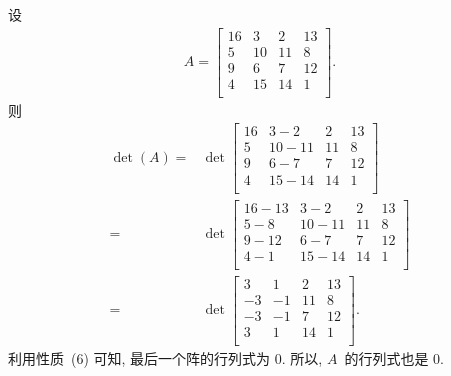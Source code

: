 \begin{example}
    设
    \begin{align*}
        A = \begin{bmatrix}
                16 & 3  & 2  & 13 \\
                5  & 10 & 11 & 8  \\
                9  & 6  & 7  & 12 \\
                4  & 15 & 14 & 1  \\
            \end{bmatrix}.
    \end{align*}
    则
    \begin{align*}
        \det {(A)}
        = {} &
        \det {
            \begin{bmatrix}
                16 & 3 - 2   & 2  & 13 \\
                5  & 10 - 11 & 11 & 8  \\
                9  & 6 - 7   & 7  & 12 \\
                4  & 15 - 14 & 14 & 1  \\
            \end{bmatrix}
        }
        \\
        = {} &
        \det {
            \begin{bmatrix}
                16 - 13 & 3 - 2   & 2  & 13 \\
                5 - 8   & 10 - 11 & 11 & 8  \\
                9 - 12  & 6 - 7   & 7  & 12 \\
                4 - 1   & 15 - 14 & 14 & 1  \\
            \end{bmatrix}
        }
        \\
        = {} &
        \det {
            \begin{bmatrix}
                3  & 1  & 2  & 13 \\
                -3 & -1 & 11 & 8  \\
                -3 & -1 & 7  & 12 \\
                3  & 1  & 14 & 1  \\
            \end{bmatrix}
        }.
    \end{align*}
    利用性质~(6) 可知, 最后一个阵的行列式为 \(0\).
    所以, \(A\)~的行列式也是 \(0\).


\end{example}
